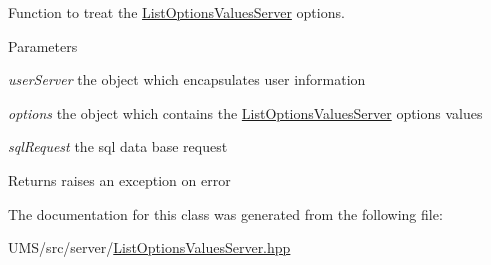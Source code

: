 Function to treat the \hyperlink{classListOptionsValuesServer}{ListOptionsValuesServer} options. 


\begin{DoxyParams}{Parameters}
\item[{\em userServer}]the object which encapsulates user information \item[{\em options}]the object which contains the \hyperlink{classListOptionsValuesServer}{ListOptionsValuesServer} options values \item[{\em sqlRequest}]the sql data base request \end{DoxyParams}
\begin{DoxyReturn}{Returns}
raises an exception on error 
\end{DoxyReturn}


The documentation for this class was generated from the following file:\begin{DoxyCompactItemize}
\item 
UMS/src/server/\hyperlink{ListOptionsValuesServer_8hpp}{ListOptionsValuesServer.hpp}\end{DoxyCompactItemize}
